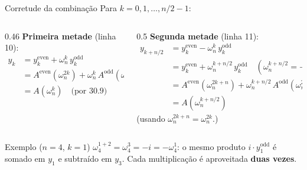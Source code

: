 \documentclass[aspectratio=169,10pt]{beamer}
\newcommand{\w}[2][n]{\omega_{#1}^{#2}}       %
\newcommand{\Aev}{A^{\mathrm{even}}}
\newcommand{\Aod}{A^{\mathrm{odd}}}
\newcommand{\yev}{y^{\mathrm{even}}}
\newcommand{\yod}{y^{\mathrm{odd}}}
\begin{document}
\begin{frame}{Corretude da combinação}
  Para $k = 0,1,\dots,n/2-1$:
  \begin{columns}[T]
    \begin{column}{0.46\textwidth}
      \textbf{Primeira metade} (linha 10):
      \begin{align*}
        y_k &= \yev_k + \w{k}\,\yod_k\\
            &= \Aev(\w{2k}) + \w{k}\,\Aod(\w{2k})\\
            &= A(\w{k}) \quad\text{(por 30.9)}
      \end{align*}
    \end{column}
    \begin{column}{0.5\textwidth}
      \textbf{Segunda metade} (linha 11):
      \begin{align*}
        y_{k+n/2} &= \yev_k - \w{k}\,\yod_k\\
                  &= \yev_k + \w{k+n/2}\,\yod_k \quad (\w{k+n/2} = -\w{k})\\
                  &= \Aev(\w{2k+n}) + \w{k+n/2}\,\Aod(\w{2k+n})\\
                  &= A(\w{k+n/2})
      \end{align*}
      {\small (usando $\w{2k+n} = \w{2k}$.)}
    \end{column}
  \end{columns}
  \vspace{6pt}
  \begin{exampleblock}{Exemplo ($n=4$, $k=1$)}
    $\w[4]{1+2} = \w[4]{3} = -i = -\w[4]{1}$: o mesmo produto $i\cdot\yod_1$ é somado em $y_1$
    e subtraído em $y_3$. Cada multiplicação é aproveitada \textbf{duas vezes}.
  \end{exampleblock}
\end{frame}
\end{document}
